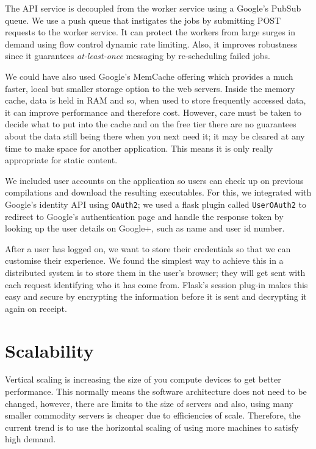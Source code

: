 \documentclass[conference]{IEEEtran}
\begin{document}
The API service is decoupled from the worker service using a Google's PubSub
queue\cite{pubsub}. We use a push queue that instigates the jobs by submitting
POST requests to the worker service. It can protect the workers from large
surges in demand using flow control dynamic rate limiting. Also, it improves
robustness since it guarantees \emph{at-least-once} messaging by re-scheduling
failed jobs.

We could have also used Google's MemCache\cite{mem} offering which provides a
much faster, local but smaller storage option to the web servers. Inside the
memory cache, data is held in RAM and so, when used to store frequently accessed
data, it can improve performance and therefore cost. However, care must be taken
to decide what to put into the cache and on the free tier there are no
guarantees about the data still being there when you next need it; it may
be cleared at any time to make space for another application. This means
it is only really appropriate for static content.

We included user accounts on the application so users can check up on previous
compilations and download the resulting executables. For this, we integrated
with Google's identity API using \texttt{OAuth2}; we used a flask
plugin called \texttt{UserOAuth2}\cite{oauth} to redirect to Google's
authentication page and handle the response token by looking up the user details 
on Google+, such as name and user id number.

After a user has logged on, we want to store their credentials so that we can
customise their experience. We found the simplest way to achieve this in a
distributed system is to store them in the user's browser; they will get sent
with each request identifying who it has come from. Flask's session plug-in
makes this easy and secure by encrypting the information before it is sent and
decrypting it again on receipt.

\section{Scalability}

Vertical scaling is increasing the size of you compute devices to get better
performance. This normally means the software architecture does not need to be
changed, however, there are limits to the size of servers and also, using many
smaller commodity servers is cheaper due to efficiencies of scale. Therefore,
the current trend is to use the horizontal scaling of using more machines to
satisfy high demand.
\end{document}

